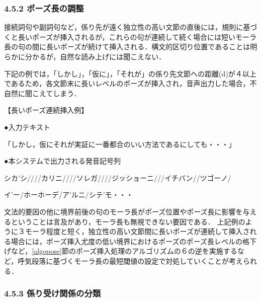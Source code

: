 \subsubsection{4.5.2 \hspace{5mm}ポーズ長の調整}

接続詞句や副詞句など，係り先が遠く独立性の高い文節の直後には，規則に基づくと長いポーズが挿入されるが，これらの句が連続して続く場合には短いモーラ長の句の間に長いポーズが続けて挿入される．構文的区切り位置であることは明らかに分かるが，自然な読み上げには聞こえない．

下記の例では，「しかし」，「仮に」，「それが」の係り先文節への距離(d)が４以上であるため，各文節末に長いレベルのポーズが挿入され，音声出力した場合，不自然に聞こえてしまう．

\vspace{0.3cm}

【長いポーズ連続挿入例】

\vspace{0.3cm}

\hspace*{0.5cm}●入力テキスト

\hspace*{1cm}「しかし，仮にそれが実証に一番都合のいい方法であるにしても・・・」

\vspace{0.3cm}

\hspace*{0.5cm}●本システムで出力される発音記号列

\hspace*{1.1cm}シカ’シ////カリニ////ソレガ////ジッショーニ///イチバン//ツゴーノ/

\hspace*{1cm}イ’ー/ホーホーデ/ア’ルニ/シテ’モ・・・

\vspace{0.4cm}

文法的要因の他に境界前後の句のモーラ長がポーズ位置やポーズ長に影響を与えるということは言及があり\cite[など]{箱田1980,Tsukada1996}，モーラ長も無視できない要因である．
上記例のように３モーラ程度と短く，独立性の高い文節間に長いポーズが連続して挿入される場合には，ポーズ挿入尤度の低い境界におけるポーズのポーズ長レベルの格下げなど，\ref{algopose}節のポーズ挿入処理のアルゴリズムの６の逆を実施するなど，呼気段落に基づくモーラ長の最短閾値の設定で対処していくことが考えられる．

\subsubsection{4.5.3 \hspace{5mm}係り受け関係の分類}

